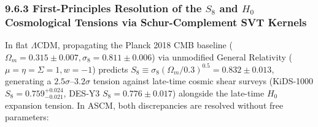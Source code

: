 \documentclass[aps,prd,onecolumn,superscriptaddress,nofootinbib,longbibliography,10pt]{revtex4-2}
\begin{document}
\subsubsection*{9.6.3 First-Principles Resolution of the \(S_8\) and \(H_0\) Cosmological Tensions via Schur-Complement SVT Kernels}

In flat $\Lambda$CDM, propagating the Planck 2018 CMB baseline (\(\Omega_m = 0.315 \pm 0.007, \sigma_8 = 0.811 \pm 0.006\)) via unmodified General Relativity (\(\mu = \eta = \Sigma = 1, w = -1\)) predicts \(S_8 \equiv \sigma_8(\Omega_m/0.3)^{0.5} = 0.832 \pm 0.013\), generating a \(2.5\sigma\text{–}3.2\sigma\) tension against late-time cosmic shear surveys (KiDS-1000 \(S_8 = 0.759^{+0.024}_{-0.021}\), DES-Y3 \(S_8 = 0.776 \pm 0.017\)) alongside the late-time \(H_0\) expansion tension. In ASCM, both discrepancies are resolved without free parameters:
\end{document}
